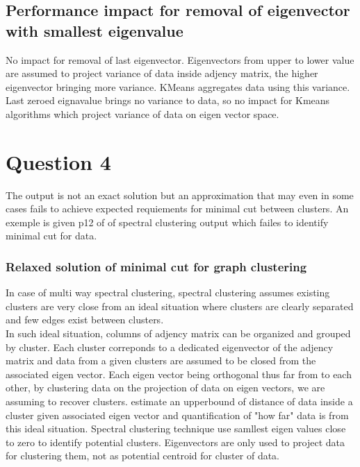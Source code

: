 \documentclass[a4paper]{article}
\begin{document}
\subsection{Performance impact for removal of eigenvector with smallest eigenvalue}


No impact for removal of last eigenvector. Eigenvectors from upper to lower value are assumed to project variance of data inside adjency matrix, the higher eigenvector bringing more variance. KMeans aggregates data using this variance. Last zeroed eignavalue brings no variance to data, so no impact for Kmeans algorithms which project variance of data  on eigen vector space.

\section{Question 4}

The output is not an exact solution but an approximation that may even in some cases fails to achieve expected requiements for minimal cut between clusters. An exemple is given p12 of \cite{luxburg2007} of spectral clustering output which failes to identify minimal cut for data.


\subsubsection{ Relaxed solution of minimal cut for graph clustering}

In case of multi way spectral clustering, spectral clustering assumes existing clusters are very close from an ideal situation where clusters are clearly separated and few edges exist between clusters.\\ 

In such ideal situation, columns of adjency matrix can be organized and grouped by cluster. Each cluster correponds to a dedicated eigenvector of the adjency matrix and data from a given clusters are assumed to be closed from the associated eigen vector. Each eigen vector being orthogonal thus far from to each other, by clustering data on the projection of data on eigen vectors, we are assuming to recover clusters. \cite{ng2001} estimate an upperbound of distance of data inside a cluster given associated eigen vector and quantification of "how far" data is from this ideal situation. Spectral clustering technique use samllest eigen values close to zero to identify potential clusters. Eigenvectors are only used to project data for clustering them, not as potential centroid for cluster of data.
\end{document}
